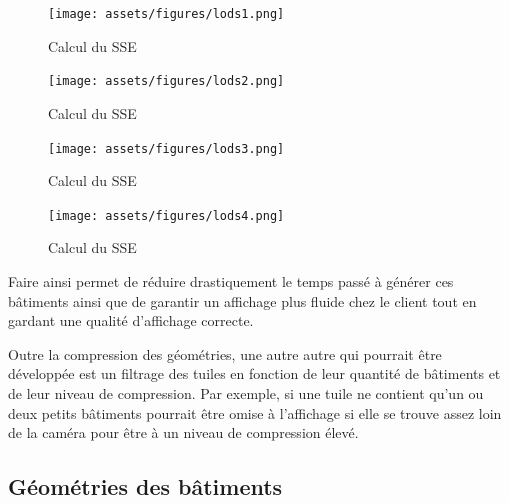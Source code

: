 \begin{figure}[H]
    \centering
    \texttt{[image: assets/figures/lods1.png]}
    \caption{Calcul du SSE \cite{3d-tiles-specification}}
    \label{fig:lods-colors}
\end{figure}

\begin{figure}[H]
    \centering
    \texttt{[image: assets/figures/lods2.png]}
    \caption{Calcul du SSE \cite{3d-tiles-specification}}
    \label{fig:lods-colors}
\end{figure}

\begin{figure}[H]
    \centering
    \texttt{[image: assets/figures/lods3.png]}
    \caption{Calcul du SSE \cite{3d-tiles-specification}}
    \label{fig:lods-colors}
\end{figure}

\begin{figure}[H]
    \centering
    \texttt{[image: assets/figures/lods4.png]}
    \caption{Calcul du SSE \cite{3d-tiles-specification}}
    \label{fig:lods-colors}
\end{figure}

Faire ainsi permet de réduire drastiquement le temps passé à générer ces bâtiments ainsi que de garantir un affichage plus fluide chez le client tout en gardant une qualité d'affichage correcte.

Outre la compression des géométries, une autre autre qui pourrait être développée est un filtrage des tuiles en fonction de leur quantité de bâtiments et de leur niveau de compression. Par exemple, si une tuile ne contient qu'un ou deux petits bâtiments pourrait être omise à l'affichage si elle se trouve assez loin de la caméra pour être à un niveau de compression élevé.

\subsection{Géométries des bâtiments}

